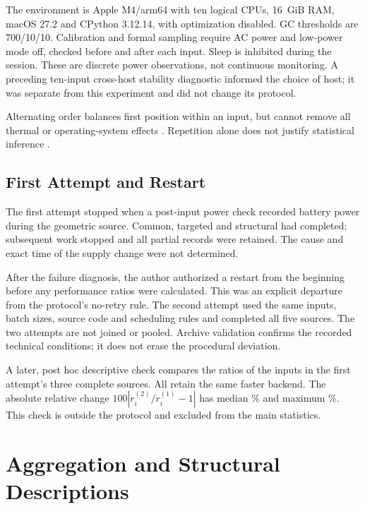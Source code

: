 The environment is Apple M4/arm64 with ten logical CPUs, 16~GiB RAM,
macOS 27.2 and CPython 3.12.14, with optimization disabled. GC thresholds
are 700/10/10. Calibration and formal sampling require AC power and low-power
mode off, checked before and after each input. Sleep is inhibited during the
session. These are discrete power observations, not continuous monitoring.
A preceding ten-input cross-host stability diagnostic informed the choice of
host; it was separate from this experiment and did not change its protocol.

Alternating order balances first position within an input, but cannot remove
all thermal or operating-system effects \parencite{mytkowicz2009wrong}.
Repetition alone does not justify statistical inference
\parencite{kalibera2013benchmarking}.

\subsection{First Attempt and Restart}
\label{sec:method-deviation}

The first attempt stopped when a post-input power check recorded battery
power during the geometric source. Common, targeted and structural had
completed; subsequent work stopped and all partial records were retained.
The cause and exact time of the supply change were not determined.

After the failure diagnosis, the author authorized a restart from the
beginning before any performance ratios were calculated. This was an explicit
departure from the protocol's no-retry rule. The second attempt used the same
inputs, batch sizes, source code and scheduling rules and completed all five
sources. The two attempts are not joined or pooled. Archive validation
confirms the recorded technical conditions; it does not erase the procedural
deviation.

A later, post hoc descriptive check compares the ratios of the
\UnifiedStabilityN{} inputs in the first attempt's three complete sources.
All \UnifiedStabilitySame{} retain the same faster backend. The absolute
relative change $100|r_i^{(2)}/r_i^{(1)}-1|$ has median
\UnifiedStabilityMedian{}\% and maximum \UnifiedStabilityMaximum{}\%.
This check is outside the protocol and excluded from the main statistics.

\section{Aggregation and Structural Descriptions}
\label{sec:method-aggregation}

